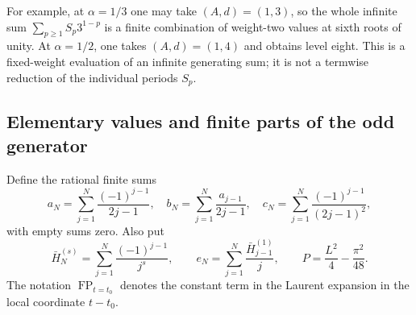 For example, at $\alpha=1/3$ one may take $(A,d)=(1,3)$, so the
whole infinite sum $\sum_{p\ge1}S_p3^{1-p}$ is a finite combination
of weight-two values at sixth roots of unity. At $\alpha=1/2$, one takes
$(A,d)=(1,4)$ and obtains level eight. This is a fixed-weight evaluation
of an infinite generating sum; it is not a termwise reduction of the
individual periods $S_p$.

\subsection{Elementary values and finite parts of the odd generator}

Define the rational finite sums
\[
 a_N=\sum_{j=1}^N\frac{(-1)^{j-1}}{2j-1},\quad
 b_N=\sum_{j=1}^N\frac{a_{j-1}}{2j-1},\quad
 c_N=\sum_{j=1}^N\frac{(-1)^{j-1}}{(2j-1)^2},
\]
with empty sums zero. Also put
\[
 \bar H_N^{(s)}=\sum_{j=1}^N\frac{(-1)^{j-1}}{j^s},\qquad
 e_N=\sum_{j=1}^N\frac{\bar H_{j-1}^{(1)}}j,
 \qquad P=\frac{L^2}{4}-\frac{\pi^2}{48}.
\]
The notation $\operatorname{FP}_{t=t_0}$ denotes the constant term in
the Laurent expansion in the local coordinate $t-t_0$.


